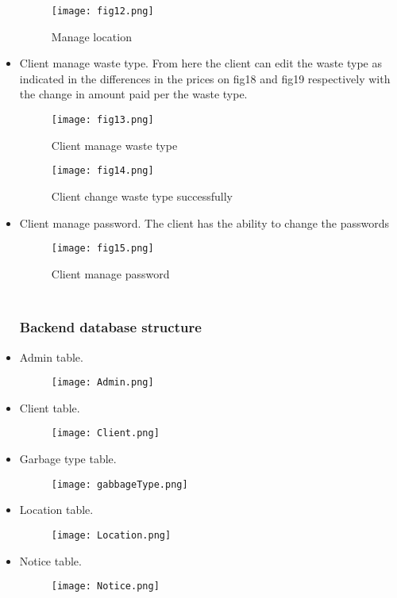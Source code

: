 \documentclass{article}
\begin{document}
\begin{itemize}
\begin{figure}[h]
\texttt{[image: fig12.png]}
\caption{Manage location}
\end{figure}
\newline
\item Client manage waste type.
\newline From here the client can edit the waste type as indicated in the differences in the prices on fig18 and fig19 respectively with the change in amount paid per the waste type.
\begin{figure}[h]
\texttt{[image: fig13.png]}
\caption{Client manage waste type}
\end{figure}
\begin{figure}[h]
\texttt{[image: fig14.png]}
\caption{Client change waste type successfully}
\end{figure}
\newline
\newpage
\item Client manage password.
\newline The client has the ability to change the passwords
\begin{figure}[h]
\texttt{[image: fig15.png]}
\caption{Client manage password}
\end{figure}
\newpage
\subsubsection{\\Backend database structure}
\item Admin table.
\begin{figure}[h]
\texttt{[image: Admin.png]}
\end{figure}
\item Client table.
\begin{figure}[h]
\texttt{[image: Client.png]}
\end{figure}
\newpage
\item Garbage type table.
\begin{figure}[h]
\texttt{[image: gabbageType.png]}
\end{figure}
\item Location table.
\begin{figure}[h]
\texttt{[image: Location.png]}
\end{figure}
\item Notice table.
\begin{figure}[h]
\texttt{[image: Notice.png]}
\end{figure}
\end{itemize}
\newpage
\end{document}
